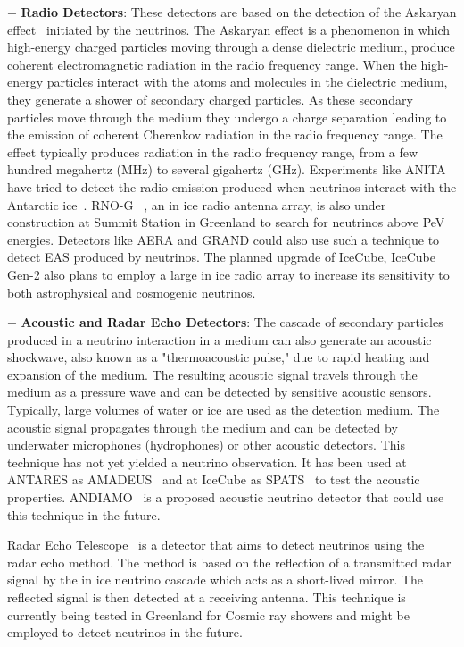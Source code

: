 \begin{description}
  \item $-$ \textbf{Radio Detectors}: These detectors are based on the detection of the Askaryan effect~\cite{} initiated by the neutrinos. The Askaryan effect is a phenomenon in which high-energy charged particles moving through a dense dielectric medium, produce coherent electromagnetic radiation in the radio frequency range.  When the high-energy particles interact with the atoms and molecules in the dielectric medium, they generate a shower of secondary charged particles. As these secondary particles move through the medium they undergo a charge separation leading to the emission of coherent Cherenkov radiation in the radio frequency range. The effect typically produces radiation in the radio frequency range, from a few hundred megahertz (MHz) to several gigahertz (GHz). Experiments like ANITA~\cite{} have tried to detect the radio emission produced when neutrinos interact with the Antarctic ice~\cite{}. RNO-G ~\cite{}, an in ice radio antenna array, is also under construction at Summit Station in Greenland to search for neutrinos above PeV energies. Detectors like AERA and GRAND could also use such a technique to detect EAS produced by neutrinos. The planned upgrade of IceCube, IceCube Gen-2 also plans to employ a large in ice radio array to increase its sensitivity to both astrophysical and cosmogenic neutrinos. 
  
  \item $-$ \textbf{Acoustic and Radar Echo Detectors}:  The cascade of secondary particles produced in a neutrino interaction in a medium can also generate an acoustic shockwave, also known as a "thermoacoustic pulse," due to rapid heating and expansion of the medium. The resulting acoustic signal travels through the medium as a pressure wave and can be detected by sensitive acoustic sensors. Typically, large volumes of water or ice are used as the detection medium. The acoustic signal propagates through the medium and can be detected by underwater microphones (hydrophones) or other acoustic detectors. This technique has not yet yielded a neutrino observation. It has been used at ANTARES as AMADEUS~\cite{} and at IceCube as SPATS~\cite{} to test the acoustic properties. ANDIAMO~\cite{} is a proposed acoustic neutrino detector that could use this technique in the future.
  
  Radar Echo Telescope~\cite{} is a detector that aims to detect neutrinos using the radar echo method. The method is based on the reflection of a transmitted radar signal by the in ice neutrino cascade which acts as a short-lived mirror. The reflected signal is then detected at a receiving antenna. This technique is currently being tested in Greenland for Cosmic ray showers and might be employed to detect neutrinos in the future.


\end{description}
